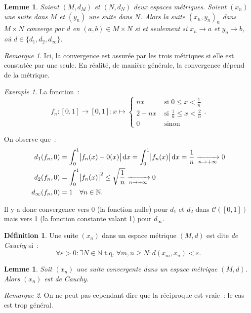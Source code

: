 \documentclass{report}
\newtheorem{lem}[thm]{Lemme}
\theoremstyle{definition}
\newtheorem{déf}[thm]{Définition}
\theoremstyle{remark}
\newtheorem*{rmq}{Remarque}
\newtheorem{ex}{Exemple}[section]
\DeclareMathOperator{\tq}{\text{ t.q. }}
\newcommand{\cont}[2]{\mathcal C\left(\left[#1, #2\right]\right)}
\newcommand{\N}{\mathbb N}
\newcommand{\pinfty}{{+\infty}}
\newcommand{\mconv}[2]{\xrightarrow[#1 \to #2]{}}
\begin{document}
		\begin{lem} Soient $(M, d_M)$ et $(N, d_N)$ deux espaces métriques. Soient $(x_n)$ une suite dans $M$ et $(y_n)$ une suite dans $N$. Alors la suite
		$(x_n, y_n)_n$ dans $M \times N$ converge par $d$ en $(a, b) \in M \times N$ si et seulement si $x_n \to a$ et $y_n \to b$, où
		$d \in \{d_1, d_2, d_\infty\}$. \end{lem}

		\begin{rmq} Ici, la convergence est assurée par les trois métriques si elle est constatée par une seule. En réalité, de manière générale, la convergence
		dépend de la métrique. \end{rmq}

		\begin{ex} La fonction~:
		\[f_n : [0, 1] \to [0, 1] : x \mapsto
			\begin{cases}nx &\text{ si } 0 \leq x < \frac 1n \\2-nx &\text{ si } \frac 1n \leq x < \frac 2n \\0 &\text{ sinon}\end{cases}.\]

		On observe que~:
		\begin{align*}
			d_1(f_n, 0) &= \int_0^1\abs{f_n(x) - 0(x)}\dif x = \int_0^1\abs {f_n(x)}\dif x = \frac 1n \mconv n\pinfty 0 \\
			d_2(f_n, 0) &= \int_0^1\abs{f_n(x)}^2 \leq \sqrt{\frac 1n} \mconv n\pinfty 0 \\
			d_\infty(f_n, 0) &= 1 \quad \forall n \in \N.
		\end{align*}

		Il y a donc convergence vers 0 (la fonction nulle) pour $d_1$ et $d_2$ dans $\cont 01$ mais vers 1 (la fonction constante valant 1)
		pour $d_\infty$. \end{ex}

		\begin{déf} Une suite $(x_n)$ dans un espace métrique $(M, d)$ est dite \textit{de Cauchy} si~:
		\[\forall \varepsilon > 0 : \exists N \in \N \tq \forall m, n \geq N : d(x_m, x_n) < \varepsilon.\]
		\end{déf}

		\begin{lem} Soit $(x_n)$ une suite convergente dans un espace métrique $(M, d)$. Alors $(x_n)$ est de Cauchy. \end{lem}

		\begin{rmq} On ne peut pas cependant dire que la réciproque est vraie~: le cas est trop général. \end{rmq}
\end{document}
